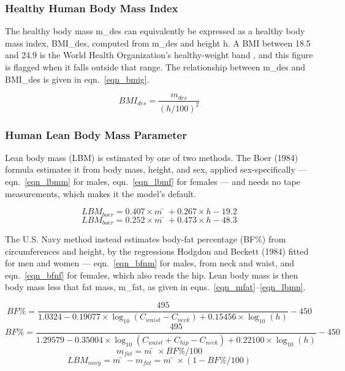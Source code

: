\subsubsection{Healthy Human Body Mass Index}

The healthy body mass m_des can equivalently be expressed as a healthy body mass index, BMI_des, computed from m_des and height h. A BMI between 18.5 and 24.9 is the World Health Organization's healthy-weight band \cite{ref_who1995}, and this figure is flagged when it falls outside that range. The relationship between m_des and BMI_des is given in eqn.~\eqref{eqn_bmig}.

\begin{equation}
\label{eqn_bmig}
BMI_{des} = \frac{m_{des}}{(h/100)^{2}}
\end{equation}

\subsubsection{Human Lean Body Mass Parameter}

Lean body mass (LBM) is estimated by one of two methods. The Boer (1984) formula \cite{ref_boer1984} estimates it from body mass, height, and sex, applied sex-specifically — eqn.~\eqref{eqn_lbmm} for males, eqn.~\eqref{eqn_lbmf} for females — and needs no tape measurements, which makes it the model's default.

\begin{equation}
\label{eqn_lbmm}
LBM_{boer} = 0.407×m̄ + 0.267×h − 19.2
\end{equation}
\begin{equation}
\label{eqn_lbmf}
LBM_{boer} = 0.252×m̄ + 0.473×h − 48.3
\end{equation}

The U.S. Navy method instead estimates body-fat percentage (BF\%) from circumferences and height, by the regressions Hodgdon and Beckett (1984) fitted for men \cite{ref_hodgdon1984m} and women \cite{ref_hodgdon1984w} — eqn.~\eqref{eqn_bfnm} for males, from neck and waist, and eqn.~\eqref{eqn_bfnf} for females, which also reads the hip. Lean body mass is then body mass less that fat mass, m\_fat, as given in eqns.~\eqref{eqn_mfat}–\eqref{eqn_lbmn}.

\begin{equation}
\label{eqn_bfnm}
BF\% = \frac{495}{1.0324 − 0.19077×\log_{10}(C_{waist} − C_{neck}) + 0.15456×\log_{10}(h)} − 450
\end{equation}
\begin{equation}
\label{eqn_bfnf}
BF\% = \frac{495}{1.29579 − 0.35004×\log_{10}(C_{waist} + C_{hip} − C_{neck}) + 0.22100×\log_{10}(h)} − 450
\end{equation}
\begin{equation}
\label{eqn_mfat}
m_{fat} = m̄ × BF\%/100
\end{equation}
\begin{equation}
\label{eqn_lbmn}
LBM_{navy} = m̄ − m_{fat} = m̄ × (1 − BF\%/100)
\end{equation}

